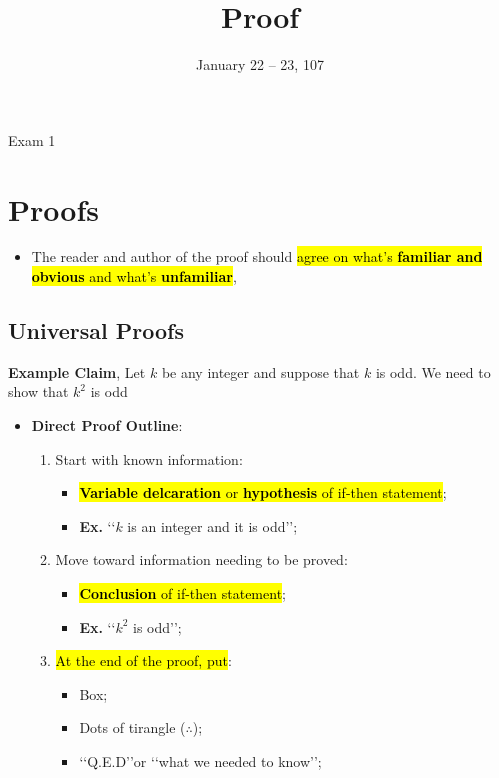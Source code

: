 \documentclass{note}
\date{January 22 -- 23, 107}
\title{Proof}
\begin{document}
    \begin{note}{Exam 1}

        \section{Proofs}

        \begin{itemize}
            \item The reader and author of the proof should \hl{agree on what's \textbf{familiar and obvious}
            and what's \textbf{unfamiliar}},
        \end{itemize}

        \subsection{Universal Proofs}

        \textbf{Example Claim}, Let $ k $ be any integer and suppose that $ k $ is odd.
        We need to show that $ k^{2} $ is odd

        \begin{itemize}

            \item \textbf{Direct Proof Outline}:

            \begin{enumerate}
                \item Start with known information:
                \begin{itemize}
                    \item \hl{\textbf{Variable delcaration} or \textbf{hypothesis} of if-then statement};
                    \item \textbf{Ex.} \lq\lq $ k $ is an integer and it is odd\rq\rq;
                \end{itemize}

                \item Move toward information needing to be proved:
                \begin{itemize}
                    \item \hl{\textbf{Conclusion} of if-then statement};
                    \item \textbf{Ex.} \lq\lq $ k^{2} $ is odd\rq\rq;
                \end{itemize}

                \item \hl{At the end of the proof, put}:
                \begin{itemize}
                    \item Box;
                    \item Dots of tirangle ($ \therefore $);
                    \item \lq\lq Q.E.D\rq\rq or \lq\lq what we needed to know\rq\rq;
                \end{itemize}
            \end{enumerate}


\end{itemize}
\end{note}
\end{document}
